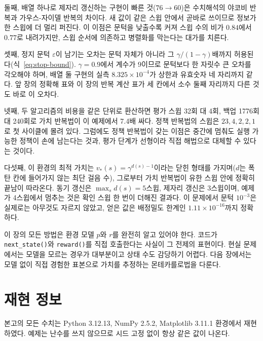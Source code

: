 \documentclass[11pt,a4paper]{article}
\begin{document}
둘째, 배열 하나로 제자리 갱신하는 구현이 빠른 것($76\to60$)은 수치해석의 야코비 반복과 가우스-자이델
반복의 차이다. 새 값이 같은 스윕 안에서 곧바로 쓰이므로 정보가 한 스윕에 더 멀리 퍼진다. 이 이점은
문턱을 낮출수록 커져 스윕 수의 비가 $0.84$에서 $0.77$로 내려가지만, 스윕 순서에 의존하고 병렬화를
막는다는 대가를 치른다.

셋째, 정지 문턱 $\varepsilon$이 남기는 오차는 문턱 자체가 아니라 그 $\gamma/(1-\gamma)$배까지
허용된다(식~\eqref{eq:stop-bound}). $\gamma=0.9$에서 계수가 $9$이므로 문턱보다 한 자릿수 큰 오차를
각오해야 하며, 배열 둘 구현의 실측 $8.325\times10^{-4}$가 상한과 유효숫자 네 자리까지 같다. 앞 장의
정확해 표와 이 장의 반복 계산 표가 세 칸에서 소수 둘째 자리까지 다른 것도 바로 이 오차다.

넷째, 두 알고리즘의 비용을 같은 단위로 환산하면 평가 스윕 32회 대 4회, 백업 1776회 대 240회로
가치 반복법이 이 예제에서 7.4배 싸다. 정책 반복법의 스윕은 $23,4,2,2,1$로 첫 사이클에 몰려 있다.
그럼에도 정책 반복법이 갖는 이점은 중간에 멈춰도 실행 가능한 정책이 손에 남는다는 것과, 평가 단계가
선형이라 직접 해법으로 대체할 수 있다는 것이다.

다섯째, 이 환경의 최적 가치는 $v_*(s)=\gamma^{d(s)-1}$이라는 닫힌 형태를 가지며($d$는 폭탄 칸에 들어가지
않는 최단 걸음 수), 그로부터 가치 반복법이 유한 스윕 안에 정확히 끝남이 따라온다. 동기 갱신은
$\max_s d(s)=5$스윕, 제자리 갱신은 3스윕이며, 예제가 4스윕에서 멈추는 것은 확인 스윕 한 번이 더해진
결과다. 이 문제에서 문턱 $10^{-3}$은 실제로는 아무것도 자르지 않았고, 얻은 값은 배정밀도 한계인
$1.11\times10^{-16}$까지 정확하다.

이 장의 모든 방법은 환경 모델 $p$와 $r$를 완전히 알고 있어야 한다. 코드가 \lstinline|next_state()|와
\lstinline|reward()|를 직접 호출한다는 사실이 그 전제의 표현이다. 현실 문제에서는 모델을 모르는 경우가
대부분이고 상태 수도 감당하기 어렵다. 다음 장에서는 모델 없이 직접 경험한 표본으로 가치를 추정하는
몬테카를로법을 다룬다.

\section*{재현 정보}

본고의 모든 수치는 Python 3.12.13, NumPy 2.5.2, Matplotlib 3.11.1 환경에서 재현하였다. 예제는 난수를
쓰지 않으므로 시드 고정 없이 항상 같은 값이 나온다.
\end{document}
